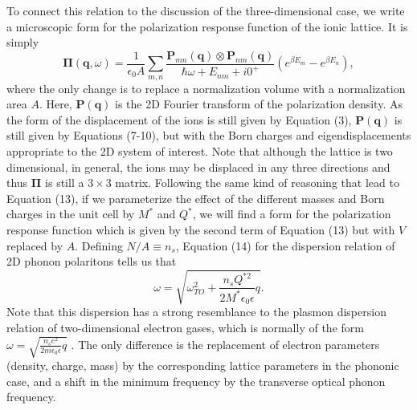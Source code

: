 \documentclass[aps,prb,twocolumn,
	groupedaddress,superscriptaddress,
	amsfonts,amssymb,amsmath,floatfix,
	citeautoscript]{revtex4-1}
\begin{document}
To connect this relation to the discussion of the three-dimensional case, we write a microscopic form for the polarization response function of the ionic lattice. It is simply
\begin{equation}
\boldsymbol{\Pi}(\mathbf{q},\omega) =  \frac{1}{\epsilon_0 A}\sum\limits_{m,n}\frac{\mathbf{P}_{mn}(\mathbf{q})\otimes\mathbf{P}_{nm}(\mathbf{q})}{\hbar\omega + E_{nm}+i0^+}\left(e^{\beta E_m}-e^{\beta E_n} \right),
\end{equation}
where the only change is to replace a normalization volume with a normalization area $A$. Here, $\mathbf{P}(\mathbf{q})$ is the 2D Fourier transform of the polarization density. As the form of the displacement of the ions is still given by Equation (3), $\mathbf{P}(\mathbf{q})$ is still given by Equations (7-10), but with the Born charges and eigendisplacements appropriate to the 2D system of interest. Note that although the lattice is two dimensional, in general, the ions may be displaced in any three directions and thus $\boldsymbol{\Pi}$ is still a $3\times3$ matrix. Following the same kind of reasoning that lead to Equation (13), if we parameterize the effect of the different masses and Born charges in the unit cell by $M^*$ and $Q^*$, we will find a form for the polarization response function which is given by the second term of Equation (13) but with $V$ replaced by $A$. Defining $N/A \equiv n_s$, Equation (14) for the dispersion relation of 2D phonon polaritons tells us that
\begin{equation}
\omega = \sqrt{\omega_{TO}^2+\frac{n_sQ^{*2}}{2M^*\epsilon_0\epsilon}q}.
\end{equation}
Note that this dispersion has a strong resemblance to the plasmon dispersion relation of two-dimensional electron gases, which is normally of the form\cite{stern1967polarizability} $\omega = \sqrt{\frac{n_s e^2  }{2m\epsilon_0\epsilon}q}$ . The only difference is the replacement of electron parameters (density, charge, mass) by the corresponding lattice parameters in the phononic case, and a shift in the minimum frequency by the transverse optical phonon frequency. 
\end{document}
